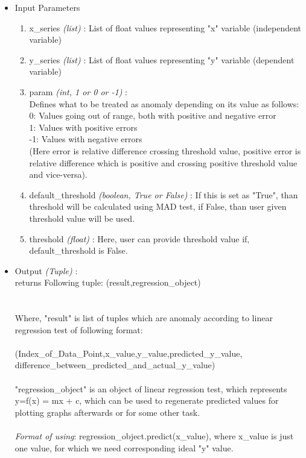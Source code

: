 \begin{itemize}
 \item Input Parameters
 
 \begin{enumerate}
  \item x\_series \textit{(list)} : List of float values representing "x" 
variable (independent variable)
  \item y\_series \textit{(list)} : List of float values representing "y" 
variable (dependent variable)
  \item param \textit{(int, 1 or 0 or -1)} : \\
  		Defines what to be treated as anomaly depending on its value as 
follows: \\
        0: Values going out of range, both with positive and negative error \\
        1: Values with positive errors \\
        -1: Values with negative errors \\
        (Here error is relative difference crossing threshold value, 
positive error is relative difference which is positive and crossing positive 
threshold value and vice-versa).
  \item default\_threshold \textit{(boolean, True or False)} : If this is set as 
"True", than threshold will be calculated using MAD test, if False, than user 
given threshold value will be used.
  \item threshold \textit{(float)} : Here, user can provide threshold value if, 
default\_threshold is False.

 \end{enumerate}

 \item Output \textit{(Tuple)} : \\
 	returns Following tuple:
  (result,regression\_object) \\
  \\
  \\
  Where, "result" is list of tuples which are anomaly according to linear 
regression test of following format: \\
	\\  
  
(Index\_of\_Data\_Point,x\_value,y\_value,predicted\_y\_value, \\
difference\_between\_predicted\_and\_actual\_y\_value)
  \\
  \\
  "regression\_object" is an object of linear regression test, which represents 
y=f(x) = mx + c,  which can be used to regenerate predicted values for plotting 
graphs afterwards or for some other task.
  \\
  \\
  \textit{Format of using}: regression\_object.predict(x\_value), where x\_value 
is just one value, for which we need corresponding ideal "y" value.
 
\end{itemize}

